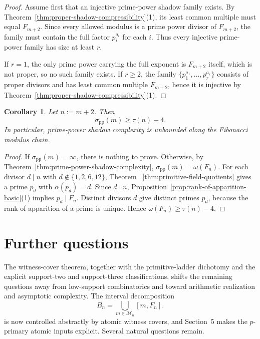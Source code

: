 \documentclass[11pt,letterpaper]{article}
\numberwithin{equation}{section}
\theoremstyle{plain}
\newtheorem{corollary}[theorem]{Corollary}
\theoremstyle{definition}
\theoremstyle{remark}
\begin{document}
\begin{proof}
Assume first that an injective prime-power shadow family exists. By
Theorem~\ref{thm:proper-shadow-compressibility}(1), its least common multiple
must equal $F_{m+2}$. Since every allowed modulus is a prime power divisor of
$F_{m+2}$, the family must contain the full factor $p_i^{a_i}$ for each $i$.
Thus every injective prime-power family has size at least $r$.

If $r=1$, the only prime power carrying the full exponent is $F_{m+2}$ itself,
which is not proper, so no such family exists. If $r\ge 2$, the family
$\{p_1^{a_1},\dots,p_r^{a_r}\}$ consists of proper divisors and has least
common multiple $F_{m+2}$, hence it is injective by
Theorem~\ref{thm:proper-shadow-compressibility}(1).
\end{proof}

\begin{corollary}
\label{cor:prime-power-shadow-divisor-lower-bound}
Let $n:=m+2$. Then
\[
\sigma_{\mathrm{pp}}(m)\ge \tau(n)-4.
\]
In particular, prime-power shadow complexity is unbounded along the Fibonacci
modulus chain.
\end{corollary}

\begin{proof}
If $\sigma_{\mathrm{pp}}(m)=\infty$, there is nothing to prove. Otherwise, by
Theorem~\ref{thm:prime-power-shadow-complexity},
$\sigma_{\mathrm{pp}}(m)=\omega(F_n)$. For each divisor
$d\mid n$ with $d\notin\{1,2,6,12\}$, Theorem
~\ref{thm:primitive-field-quotients} gives a prime $p_d$ with $\alpha(p_d)=d$.
Since $d\mid n$, Proposition~\ref{prop:rank-of-apparition-basic}(1) implies
$p_d\mid F_n$. Distinct divisors $d$ give distinct primes $p_d$, because the
rank of apparition of a prime is unique. Hence
$\omega(F_n)\ge \tau(n)-4$.
\end{proof}

\section{Further questions}

The witness-cover theorem, together with the primitive-ladder dichotomy and the
explicit support-two and support-three classifications, shifts the remaining
questions away from low-support combinatorics and toward arithmetic realization
and asymptotic complexity. The interval decomposition
\[
B_n=\bigcup_{m\in\mathcal M_n}[m,F_n].
\]
is now controlled abstractly by atomic witness covers, and Section~5 makes the
$p$-primary atomic inputs explicit. Several natural questions remain.
\end{document}
